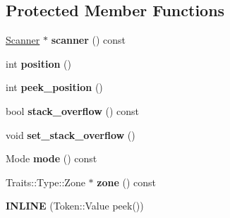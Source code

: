\subsection*{Protected Member Functions}
\begin{DoxyCompactItemize}
\item 
\hypertarget{classv8_1_1internal_1_1_parser_base_a586801814bb34b65c526fbc368aa7fc1}{}\hyperlink{classv8_1_1internal_1_1_scanner}{Scanner} $\ast$ {\bfseries scanner} () const \label{classv8_1_1internal_1_1_parser_base_a586801814bb34b65c526fbc368aa7fc1}

\item 
\hypertarget{classv8_1_1internal_1_1_parser_base_aa9d7a17bbfc644aa904b8ffe7b42576e}{}int {\bfseries position} ()\label{classv8_1_1internal_1_1_parser_base_aa9d7a17bbfc644aa904b8ffe7b42576e}

\item 
\hypertarget{classv8_1_1internal_1_1_parser_base_a5df676d4e307a57fdf65ef4e9c200ee5}{}int {\bfseries peek\+\_\+position} ()\label{classv8_1_1internal_1_1_parser_base_a5df676d4e307a57fdf65ef4e9c200ee5}

\item 
\hypertarget{classv8_1_1internal_1_1_parser_base_aeb0dcd37b3d2c431623c3628aa1eaf82}{}bool {\bfseries stack\+\_\+overflow} () const \label{classv8_1_1internal_1_1_parser_base_aeb0dcd37b3d2c431623c3628aa1eaf82}

\item 
\hypertarget{classv8_1_1internal_1_1_parser_base_a6178c77d37d0fc54458983e03a3edef4}{}void {\bfseries set\+\_\+stack\+\_\+overflow} ()\label{classv8_1_1internal_1_1_parser_base_a6178c77d37d0fc54458983e03a3edef4}

\item 
\hypertarget{classv8_1_1internal_1_1_parser_base_a855fd513eb3bf7bcfc676f7d3094d964}{}Mode {\bfseries mode} () const \label{classv8_1_1internal_1_1_parser_base_a855fd513eb3bf7bcfc676f7d3094d964}

\item 
\hypertarget{classv8_1_1internal_1_1_parser_base_a0a8ee9ac203dd95e974d13b07be733ec}{}Traits\+::\+Type\+::\+Zone $\ast$ {\bfseries zone} () const \label{classv8_1_1internal_1_1_parser_base_a0a8ee9ac203dd95e974d13b07be733ec}

\item 
\hypertarget{classv8_1_1internal_1_1_parser_base_a094817d9372192742b821e17cc14ce8c}{}{\bfseries I\+N\+L\+I\+N\+E} (Token\+::\+Value peek())\label{classv8_1_1internal_1_1_parser_base_a094817d9372192742b821e17cc14ce8c}


\end{DoxyCompactItemize}
